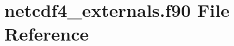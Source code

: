 \hypertarget{netcdf4__externals_8f90}{}\section{netcdf4\+\_\+externals.\+f90 File Reference}
\label{netcdf4__externals_8f90}
